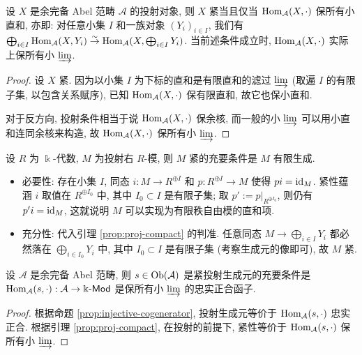 \begin{lemma}\label{prop:proj-compact}
	设 $X$ 是余完备 Abel 范畴 $\mathcal{A}$ 的投射对象, 则 $X$ 紧当且仅当 $\operatorname{Hom}_{\mathcal{A}}(X, \cdot)$ 保所有小直和, 亦即: 对任意小集 $I$ 和一族对象 $(Y_i)_{i \in I}$, 我们有 $\bigoplus_{i \in I} \operatorname{Hom}_{\mathcal{A}}(X, Y_i) \stackrel{\sim}{\rightarrow} \operatorname{Hom}_{\mathcal{A}}(X, \bigoplus_{i \in I} Y_i)$. 当前述条件成立时, $\operatorname{Hom}_{\mathcal{A}}(X, \cdot)$ 实际上保所有小 $\varinjlim$.
\end{lemma}
\begin{proof}
	设 $X$ 紧. 因为以小集 $I$ 为下标的直和是有限直和的滤过 $\varinjlim$ (取遍 $I$ 的有限子集, 以包含关系赋序), 已知 $\operatorname{Hom}_{\mathcal{A}}(X, \cdot)$ 保有限直和, 故它也保小直和.
	
	对于反方向, 投射条件相当于说 $\operatorname{Hom}_{\mathcal{A}}(X, \cdot)$ 保余核, 而一般的小 $\varinjlim$ 可以用小直和连同余核来构造, 故 $\operatorname{Hom}_{\mathcal{A}}(X, \cdot)$ 保所有小 $\varinjlim$.
\end{proof}

\begin{example}
	设 $R$ 为 $\Bbbk$-代数, $M$ 为投射右 $R$-模, 则 $M$ 紧的充要条件是 $M$ 有限生成.
	\begin{itemize}
		\item 必要性: 存在小集 $I$, 同态 $i: M \to R^{\oplus I}$ 和 $p: R^{\oplus I} \to M$ 使得 $pi = \mathrm{id}_M$. 紧性蕴涵 $i$ 取值在 $R^{\oplus I_0}$ 中, 其中 $I_0 \subset I$ 是有限子集; 取 $p' := p|_{R^{\oplus I_0}}$, 则仍有 $p' i = \mathrm{id}_M$, 这就说明 $M$ 可以实现为有限秩自由模的直和项.
		\item 充分性: 代入引理 \ref{prop:proj-compact} 的判准. 任意同态 $M \to \bigoplus_{i \in I} Y_i$ 都必然落在 $\bigoplus_{i \in I_0} Y_i$ 中, 其中 $I_0 \subset I$ 是有限子集 (考察生成元的像即可), 故 $M$ 紧.
	\end{itemize}
\end{example}

\begin{proposition}\label{prop:proj-compact-gen}
	设 $\mathcal{A}$ 是余完备 Abel 范畴, 则 $s \in \operatorname{Ob}(\mathcal{A})$ 是紧投射生成元的充要条件是 $\operatorname{Hom}_{\mathcal{A}}(s, \cdot): \mathcal{A} \to \Bbbk\text{-}\mathsf{Mod}$ 是保所有小 $\varinjlim$ 的忠实正合函子.
\end{proposition}
\begin{proof}
	根据命题 \ref{prop:injective-cogenerator}, 投射生成元等价于 $\operatorname{Hom}_{\mathcal{A}}(s, \cdot)$ 忠实正合. 根据引理 \ref{prop:proj-compact}, 在投射的前提下, 紧性等价于 $\operatorname{Hom}_{\mathcal{A}}(s, \cdot)$ 保所有小 $\varinjlim$.
\end{proof}

